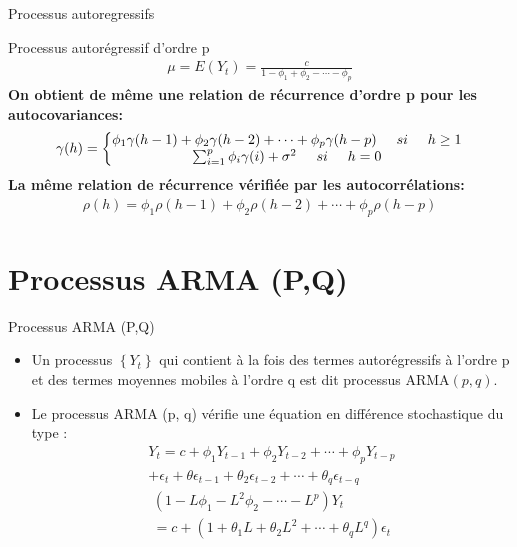 \documentclass{beamer}
\begin{document}
\begin{frame}{Processus autoregressifs}
\begin{block}{Processus autorégressif d’ordre p}
\begin{align*}
\mu=E(Y_t)=\frac{c}{1-\phi_1+\phi_2-\cdots-\phi_p}
\end{align*}
\textbf{On obtient de même une relation de récurrence d’ordre p pour les autocovariances:}
\begin{align*}
\gamma(h)=\left\{\begin{matrix}
\phi_1 \gamma(h-1)+\phi_2\gamma(h-2)+\cdots+\phi_p\gamma(h-p) \hspace{0.5cm} si \hspace{0.5cm} h\ge 1  \\ 
\sum_{i=1}^{p}\phi_i\gamma (i)+\sigma^2 \hspace{0.5cm} si \hspace{0.5cm} h=0  
\end{matrix}\right.
\end{align*}
\textbf{La même relation de récurrence vérifiée par les autocorrélations:}
\begin{align*}
\rho(h)= \phi_1 \rho(h-1)+\phi_2\rho(h-2)+\cdots+\phi_p\rho(h-p)
\end{align*}
\end{block}
\end{frame}

\section{Processus ARMA (P,Q)}
\frame{\tableofcontents[current]}
\begin{frame}{Processus ARMA (P,Q)}
\begin{itemize}
\item Un processus $\left\{ Y_t \right\}$ qui contient à la fois des termes autorégressifs à l’ordre p et des termes moyennes mobiles à l’ordre q est dit processus ARMA$(p,q)$.
\item Le processus ARMA (p, q) vérifie une équation en différence stochastique du type :
\begin{align*}
Y_t=c+\phi_1 Y_{t-1}+  \phi_2 Y_{t-2}+ \cdots +\phi_p Y_{t-p} \\ +\epsilon_t+\theta \epsilon_{t-1}+ \theta_2 \epsilon_{t-2}+\cdots+\theta_q \epsilon_{t-q}
\end{align*}
\begin{align*}
(1-L\phi_1-L^2\phi_2-\cdots- L^p)Y_t \\ =c+(1+\theta_1L +\theta_2L^2+\cdots+\theta_qL^q)\epsilon_t
\end{align*}
\end{itemize}
\end{frame}
\end{document}
